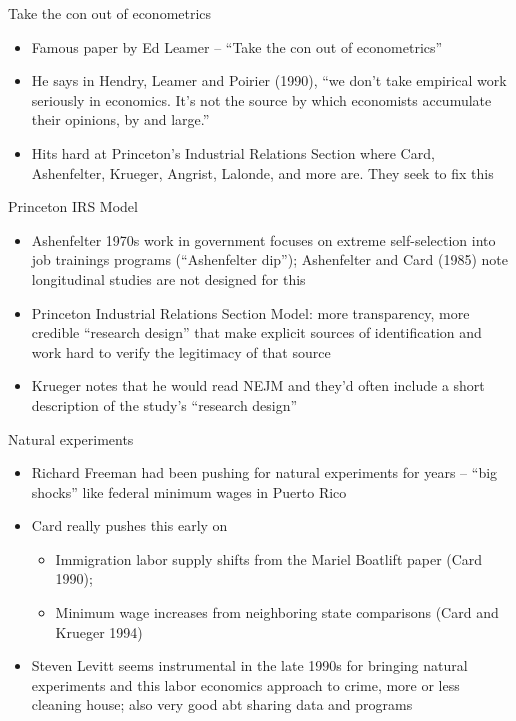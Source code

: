 \documentclass{beamer}
\begin{document}
\begin{frame}{Take the con out of econometrics}

\begin{itemize}
\item Famous paper by Ed Leamer -- ``Take the con out of econometrics''
\item He says in Hendry, Leamer and Poirier (1990), ``we don't take empirical work seriously in economics. It's not the source by which economists accumulate their opinions, by and large.''
\item Hits hard at Princeton's Industrial Relations Section where Card, Ashenfelter, Krueger, Angrist, Lalonde, and more are. They seek to fix this
\end{itemize}

\end{frame}

\begin{frame}{Princeton IRS Model}

\begin{itemize}
\item Ashenfelter 1970s work in government focuses on extreme self-selection into job trainings programs (``Ashenfelter dip''); Ashenfelter and Card (1985) note longitudinal studies are not designed for this 
\item Princeton Industrial Relations Section Model: more transparency, more credible ``research design'' that make explicit sources of identification and work hard to verify the legitimacy of that source
\item Krueger notes that he would read NEJM and they'd often include a short description of the study's ``research design''
\end{itemize}

\end{frame}

\begin{frame}{Natural experiments}

\begin{itemize}
\item Richard Freeman had been pushing for natural experiments for years -- ``big shocks'' like federal minimum wages in Puerto Rico
\item Card really pushes this early on 
	\begin{itemize}
	\item Immigration labor supply shifts from the Mariel Boatlift paper (Card 1990); 
	\item Minimum wage increases from neighboring state comparisons (Card and Krueger 1994)
	\end{itemize}
\item Steven Levitt seems instrumental in the late 1990s for bringing natural experiments and this labor economics approach to crime, more or less cleaning house; also very good abt sharing data and programs

\end{itemize}

\end{frame}
\end{document}
